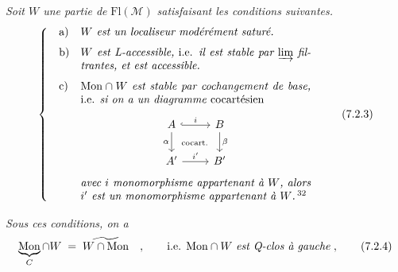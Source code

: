 \documentclass[11pt]{article}
\newcommand{\msp}[1]{\marginpar{\footnotesize [#1]}}
\newcommand{\M}{\mathcal{M}}
\newcommand{\Mon}{\mathrm{Mon}}
\newcommand{\Fl}{\mathrm{Fl}}
\begin{document}
\textit{Soit $W$ une partie de} $\Fl(\M)$ \textit{satisfaisant les conditions suivantes.}
\[
\left\{
\begin{array}{@{\quad}l@{\quad}p{0.6\textwidth}}
\text{a)} & \textit{$W$ est un localiseur modérément saturé.} \\[1.5ex]
\text{b)} & \textit{$W$ est L-accessible,} i.e. \textit{il est stable par $\varinjlim$ filtrantes, et est accessible.} \\[1.5ex]
\text{c)} & $\Mon \cap W$ \textit{est stable par cochangement de base,} i.e. \textit{si on a un diagramme} cocartésien
\begin{center}
\begin{tikzcd}[ampersand replacement=\&]
A \arrow[r, hook, "i"] \arrow[d, "\alpha"'] \arrow[dr, phantom, "\scriptstyle\text{cocart.}"] \& B \arrow[d, "\beta"] \\
A' \arrow[r, "i'"] \& B'
\end{tikzcd}
\end{center}
\textit{avec $i$ monomorphisme appartenant à $W$, alors $i'$ est un monomorphisme appartenant à $W$.}\,\footnotemark[32]
\end{array}
\right.
\tag*{(7.2.3)}
\]

\msp{page 89}
\textit{Sous ces conditions, on a}
\[
\underbrace{\Mon}_{C} \cap W \;=\; \widetilde{W \cap \Mon} \quad , \qquad \text{i.e. } \Mon \cap W \text{ \textit{est Q-clos à gauche}} \;,
\tag*{(7.2.4)}
\]
\end{document}
